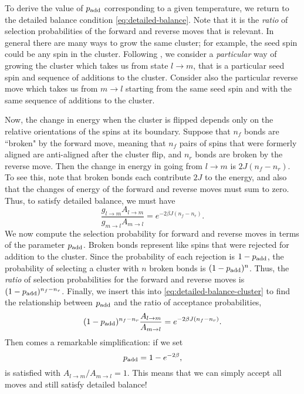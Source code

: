 To derive the value of $p_{\mathrm{add}}$ corresponding to a given temperature, we return
to the detailed balance condition \eqref{eq:detailed-balance}. Note that it is
the \emph{ratio} of selection probabilities of the forward and reverse moves
that is relevant. In general there are many ways to grow the same cluster; for
example, the seed spin could be any spin in the cluster. Following
\textcite{newman1999monte}, we consider a \emph{particular} way of growing the
cluster which takes us from state $l \to m$, that is a particular seed spin and
sequence of additions to the cluster. Consider also the particular reverse move
which takes us from $m \to l$ starting from the same seed spin and with the
same sequence of additions to the cluster.

Now, the change in energy when the cluster is flipped depends only on the
relative orientations of the spins at its boundary. Suppose that $n_f$ bonds
are ``broken" by the forward move, meaning that $n_f$ pairs of spins that were
formerly aligned are anti-aligned after the cluster flip, and $n_r$ bonds are
broken by the reverse move. Then the change in energy in going from $l \to m$
is $2J(n_f - n_r)$. To see this, note that broken bonds each contribute $2J$ to
the energy, and also that the changes of energy of the forward and reverse
moves must sum to zero. Thus, to satisfy detailed balance, we must have
\begin{equation}
  \frac{g_{l \to m} A_{l \to m}}{g_{m \to l} A_{m \to l}}
  = e^{-2 \beta J(n_f - n_r)}.
  \label{eq:detailed-balance-cluster}
\end{equation}
We now compute the selection probability for forward and reverse moves in terms
of the parameter $p_{\mathrm{add}}$. Broken bonds represent like spins that were rejected
for addition to the cluster. Since the probability of each rejection is $1-p_{\mathrm{add}}$,
the probability of selecting a cluster with $n$ broken bonds is $(1-p_{\mathrm{add}})^n$.
Thus, the \emph{ratio} of selection probabilities for the forward and reverse
moves is $(1-p_{\mathrm{add}})^{n_f-n_r}$. Finally, we insert this into
\cref{eq:detailed-balance-cluster} to find the relationship between $p_{\mathrm{add}}$
and the ratio of acceptance probabilities,
\begin{equation}
  (1-p_{\mathrm{add}})^{n_f-n_r} \frac{A_{l \to m}}{A_{m \to l}}
  = e^{-2 \beta J(n_f - n_r)}.
  \label{eq:detailed-balance-cluster-2}
\end{equation}
Then comes a remarkable simplification: if we set
\begin{equation}
  p_{\mathrm{add}}=1-e^{-2\beta},
\end{equation}
 is satisfied with $A_{l \to m}/A_{m \to
  l}=1$. This means that we can simply accept all moves and still satisfy
detailed balance!

